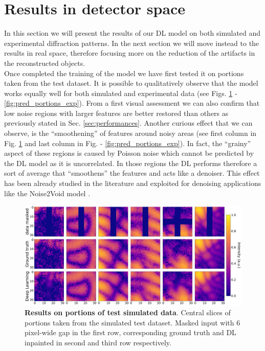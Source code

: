 \section{Results in detector space}\label{sec:res_rec}

In this section we will present the results of our DL model on both simulated and experimental diffraction patterns. In
the next section we will move instead to the results in real space, therefore focusing more on the reduction of the artifacts 
in the reconstructed objects.\\

Once completed the training of the model we have first tested it on portions taken from the test dataset. It is possible
to qualitatively observe that the model works equally well for both simulated and experimental data (see Figs. \ref{fig:pred_portions_sim}
- \ref{fig:pred_portions_exp}). From a first visual assessment we can also confirm that low noise regions with larger features
are better restored than others as previously stated in Sec. \ref{sec:performances}. Another curious effect that we can observe, 
is the ``smoothening'' of features around noisy areas (see first column in Fig. \ref{fig:pred_portions_sim} and last column in Fig.
- \ref{fig:pred_portions_exp}). In fact, the ``grainy'' aspect of these regions is caused by Poisson noise which cannot
be predicted by the DL model as it is uncorrelated. In those regions the DL performs therefore a sort of average that 
``smoothens'' the features and acts like a denoiser. This effect has been already studied in the literature and exploited 
for denoising applications like the Noise2Void model \cite{Noise2Void}.

\begin{figure}[h]
    \centering
    \includegraphics[width=\textwidth]{figures/Inpainting/prediction_small_simulated.pdf}
    \caption{\textbf{Results on portions of test simulated data}. Central slices of portions taken from the simulated test
    dataset. Masked input with 6 pixel-wide gap in the first row, corresponding ground truth and DL inpainted in second and third
    row respectively.}
    \label{fig:pred_portions_sim}
\end{figure}

